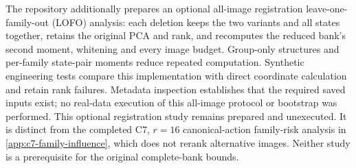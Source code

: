 The repository additionally prepares an optional all-image registration leave-one-family-out (LOFO) analysis: each deletion keeps the two variants and all states together, retains the original PCA and rank, and recomputes the reduced bank's second moment, whitening and every image budget. Group-only structures and per-family state-pair moments reduce repeated computation. Synthetic engineering tests compare this implementation with direct coordinate calculation and retain rank failures. Metadata inspection establishes that the required saved inputs exist; no real-data execution of this all-image protocol or bootstrap was performed. This optional registration study remains prepared and unexecuted. It is distinct from the completed C7, $r=16$ canonical-action family-risk analysis in \cref{app:c7-family-influence}, which does not rerank alternative images. Neither study is a prerequisite for the original complete-bank bounds.

\begin{table}[p]
\centering\small

\caption{C7 complete spectral margins, spread and original-tolerance rank intervals. U/T/B denotes unique leading/tied leading/behind. Full-precision CSV values and canonical image hashes are retained.}
\label{tab:bounded-cell-margins-c7}
\end{table}
\begin{table}[p]
\centering\small

\caption{D4 complete spectral margins, spread and original-tolerance rank intervals. These registered tasks have different target correspondences and do not provide exact-action risk rankings.}
\label{tab:bounded-cell-margins-d4}
\end{table}
\FloatBarrier
